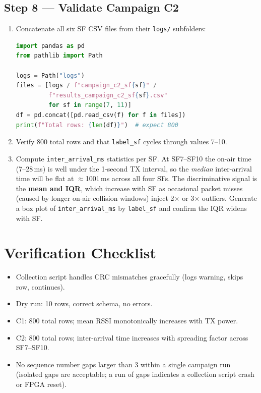 \documentclass[11pt,letterpaper]{article}
\begin{document}
\subsection{Step 8 --- Validate Campaign C2}
\begin{enumerate}[leftmargin=2em]
	\item Concatenate all six SF CSV files from their \texttt{logs/} subfolders:
	\begin{lstlisting}[language=Python, caption={Campaign C2 validation.}]
import pandas as pd
from pathlib import Path

logs = Path("logs")
files = [logs / f"campaign_c2_sf{sf}" /
         f"results_campaign_c2_sf{sf}.csv"
         for sf in range(7, 11)]
df = pd.concat([pd.read_csv(f) for f in files])
print(f"Total rows: {len(df)}")  # expect 800
	\end{lstlisting}
	\item Verify 800 total rows and that \texttt{label\_sf} cycles through values 7--10.
	\item Compute \texttt{inter\_arrival\_ms} statistics per SF. At SF7--SF10 the on-air time (7--28\,ms) is well under the 1-second TX interval, so the \emph{median} inter-arrival time will be flat at $\approx$1001\,ms across all four SFs. The discriminative signal is the \textbf{mean and IQR}, which increase with SF as occasional packet misses (caused by longer on-air collision windows) inject 2$\times$ or 3$\times$ outliers. Generate a box plot of \texttt{inter\_arrival\_ms} by \texttt{label\_sf} and confirm the IQR widens with SF.
\end{enumerate}


\section{Verification Checklist}
\begin{itemize}[leftmargin=2em]
	\item[$\square$] Collection script handles \mbox{CRC} mismatches gracefully (logs warning, skips row, continues).
	\item[$\square$] Dry run: 10 rows, correct schema, no errors.
	\item[$\square$] C1: 800 total rows; mean \mbox{RSSI} monotonically increases with \mbox{TX} power.
	\item[$\square$] C2: 800 total rows; inter-arrival time increases with spreading factor across SF7--SF10.
	\item[$\square$] No sequence number gaps larger than 3 within a single campaign run (isolated gaps are acceptable; a run of gaps indicates a collection script crash or FPGA reset).
\end{itemize}
\end{document}
